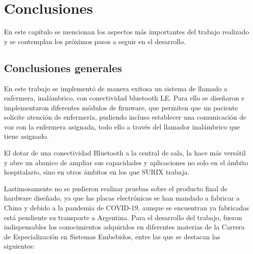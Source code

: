 
\chapter{Conclusiones} %

\label{Chapter5} %

En este capítulo se mencionan los aspectos más importantes del trabajo realizado y se contemplan los próximos pasos a seguir en el desarrollo.




\section{Conclusiones generales }

En este trabajo se implementó de manera exitosa un sistema de llamado a enfermera, inalámbrico, con conectividad bluetooth LE. Para ello se diseñaron e implementaron diferentes módulos de firmware, que permiten que un paciente solicite atención de enfermería, pudiendo incluso establecer una comunicación de voz con la enfermera asignada, todo ello a través del llamador inalámbrico que tiene asignado.

El dotar de una conectividad Bluetooth a la central de sala, la hace más versátil y abre un abanico de ampliar sus capacidades y aplicaciones no solo en el ámbito hospitalario, sino en otros ámbitos en los que SURIX trabaja.

Lastimosamente no se pudieron realizar pruebas sobre el producto final de hardware diseñado, ya que las placas electrónicas se han mandado a fabricar a China y debido a la pandemia de COVID-19, aunque se encuentran ya fabricadas está pendiente su transporte a Argentina.
Para el desarrollo del trabajo, fueron indispensables los conocimientos adquiridos en diferentes materias de la Carrera de Especialización en Sistemas Embebidos, entre las que se destacan las siguientes:


